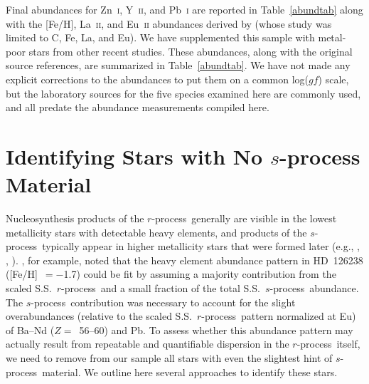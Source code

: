 \documentclass{emulateapj}
\def\rpro{\mbox{$r$-process}}
\def\spro{\mbox{$s$-process}}
\begin{document}
Final abundances for Zn~\textsc{i}, Y~\textsc{ii}, and Pb~\textsc{i} 
are reported in Table~\ref{abundtab} along with the
[Fe/H], La~\textsc{ii}, and Eu~\textsc{ii} abundances
derived by \citet{simmerer04} (whose study was limited to C, Fe,
La, and Eu).
We have supplemented this sample with metal-poor stars from other 
recent studies.
These abundances, along with the original source references,
are summarized in Table~\ref{abundtab}.
We have not made any explicit corrections to the abundances to 
put them on a common log($gf$) scale, but the laboratory sources
for the five species examined here are commonly used, 
and all predate the abundance measurements compiled here.


\section{Identifying Stars with No $s$-process Material}
\label{nos}


Nucleosynthesis products of the \rpro\ generally are visible in
the lowest metallicity stars with detectable heavy elements,
and products of the \spro\ typically appear in higher metallicity
stars that were formed later (e.g., \citealt{gratton94},
\citealt{burris00}, \citealt{simmerer04}).
\citet{cowan96}, for example, noted that the heavy element abundance
pattern in \mbox{HD~126238} ([Fe/H]~$= -$1.7)
could be fit by assuming a majority contribution
from the scaled S.S.\ \rpro\ and a small fraction of the
total S.S.\ \spro\ abundance.
The \spro\ contribution was necessary to account for the
slight overabundances (relative to the scaled S.S.\ \rpro\ 
pattern normalized at Eu) of Ba--Nd ($Z =$~56--60) and Pb.
To assess whether this abundance pattern
may actually result from repeatable and quantifiable dispersion 
in the \rpro\ itself, we need to remove from our sample
all stars with even the slightest hint of \spro\ material.
We outline here several approaches to identify these stars.
\end{document}
